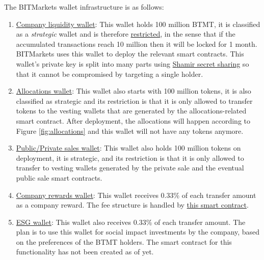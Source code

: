 \documentclass[a4paper,12pt]{article}
\begin{document}
The BITMarkets wallet infrastructure is as follows:
\begin{enumerate}
  \item \label{wallet:liquidity} \href{https://mumbai.polygonscan.com/address/0x29faB37886099219ba80c578E0A21dD11f86851F}{Company liquidity wallet}: This wallet holds 100 million BTMT, it is classified as a \textit{strategic} wallet and is therefore \href{https://github.com/UAB-BITmarkets/token/blob/master/contracts/token/ERC20StrategicWalletRestrictions.sol}{restricted}, in the sense that if the accumulated transactions reach 10 million then it will be locked for 1 month. BITMarkets uses this wallet to deploy the relevant smart contracts. This wallet's private key is split into many parts using \href{https://en.wikipedia.org/wiki/Shamir\%27s_secret_sharing}{Shamir secret sharing} so that it cannot be compromised by targeting a single holder.

  \item \label{wallet:allocations} \href{https://mumbai.polygonscan.com/address/0x79ec4fd856AC42eF9f15d8B4A7Ec0cF3A136D062}{Allocations wallet}: This wallet also starts with 100 million tokens, it is also classified as strategic and its restriction is that it is only allowed to transfer tokens to the vesting wallets that are generated by the allocations-related smart contract. After deployment, the allocations will happen according to Figure \ref{fig:allocations} and this wallet will not have any tokens anymore.

  \item \label{wallet:crowdsales} \href{https://mumbai.polygonscan.com/address/0x9852e238Bcf28F4c918a3921f7aeb4df23cABCEa}{Public/Private sales wallet}: This wallet also holds 100 million tokens on deployment, it is strategic, and its restriction is that it is only allowed to transfer to vesting wallets generated by the private sale and the eventual public sale smart contracts.

  \item \label{wallet:rewards} \href{https://mumbai.polygonscan.com/address/0x90508C30Ea3Be576347F595a6d0A144ED8b9bC3c}{Company rewards wallet}: This wallet receives 0.33\% of each transfer amount as a company reward. The fee structure is handled by \href{https://github.com/UAB-BITmarkets/token/blob/master/contracts/token/ERC20Fees.sol}{this smart contract}.

  \item \label{wallet:esg} \href{https://mumbai.polygonscan.com/address/0x0c1DD3fbB5e173c65E4801b8D3780830F80fC5cD}{ESG wallet}: This wallet also receives 0.33\% of each transfer amount. The plan is to use this wallet for social impact investments by the company, based on the preferences of the BTMT holders. The smart contract for this functionality has not been created as of yet.


\end{enumerate}
\end{document}
